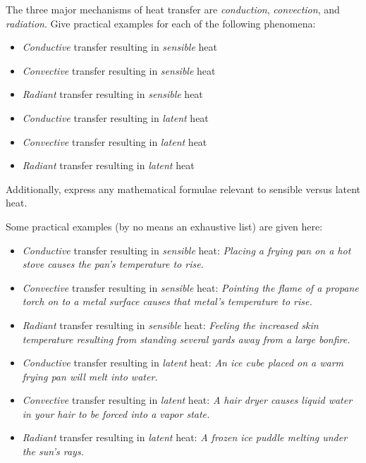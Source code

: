 

The three major mechanisms of heat transfer are {\it conduction}, {\it convection}, and {\it radiation}.  Give practical examples for each of the following phenomena:

\begin{itemize}
\item{} {\it Conductive} transfer resulting in {\it sensible} heat
\vskip 10pt
\item{} {\it Convective} transfer resulting in {\it sensible} heat
\vskip 10pt
\item{} {\it Radiant} transfer resulting in {\it sensible} heat
\vskip 10pt
\item{} {\it Conductive} transfer resulting in {\it latent} heat
\vskip 10pt
\item{} {\it Convective} transfer resulting in {\it latent} heat
\vskip 10pt
\item{} {\it Radiant} transfer resulting in {\it latent} heat
\end{itemize}

\vskip 10pt

Additionally, express any mathematical formulae relevant to sensible versus latent heat.







Some practical examples (by no means an exhaustive list) are given here:

\begin{itemize}
\item{} {\it Conductive} transfer resulting in {\it sensible} heat: {\it Placing a frying pan on a hot stove causes the pan's temperature to rise.}
\vskip 10pt
\item{} {\it Convective} transfer resulting in {\it sensible} heat: {\it Pointing the flame of a propane torch on to a metal surface causes that metal's temperature to rise.}
\vskip 10pt
\item{} {\it Radiant} transfer resulting in {\it sensible} heat: {\it Feeling the increased skin temperature resulting from standing several yards away from a large bonfire.}
\vskip 10pt
\item{} {\it Conductive} transfer resulting in {\it latent} heat: {\it An ice cube placed on a warm frying pan will melt into water.}
\vskip 10pt
\item{} {\it Convective} transfer resulting in {\it latent} heat: {\it A hair dryer causes liquid water in your hair to be forced into a vapor state.}
\vskip 10pt
\item{} {\it Radiant} transfer resulting in {\it latent} heat: {\it A frozen ice puddle melting under the sun's rays.}
\end{itemize}

